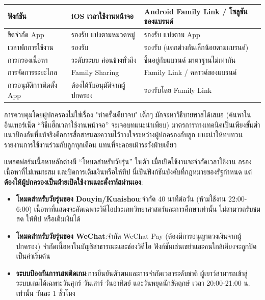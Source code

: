 \begin{center}
\begin{tabularx}{\linewidth}{|X|X|X|}
\hline
\textbf{ฟังก์ชัน} & \textbf{iOS เวลาใช้งานหน้าจอ} & \textbf{Android Family Link / โซลูชันของแบรนด์} \tabularnewline
\hline
ขีดจำกัด App & รองรับ แบ่งตามหมวดหมู่ & รองรับ แบ่งตาม App \tabularnewline
เวลาพักการใช้งาน & รองรับ & รองรับ (แตกต่างกันเล็กน้อยตามแบรนด์) \tabularnewline
การกรองเนื้อหา & ระดับระบบ ค่อนข้างทั่วถึง & ขึ้นอยู่กับแบรนด์ มาตรฐานไม่เท่ากัน \tabularnewline
การจัดการระยะไกล & Family Sharing & Family Link / คลาวด์ของแบรนด์ \tabularnewline
การอนุมัติการติดตั้ง App & ต้องได้รับอนุมัติจากผู้ปกครอง & รองรับโดย Family Link \tabularnewline
\hline
\end{tabularx}
\end{center}

\begin{tcbwarn}{การควบคุมโดยผู้ปกครองไม่ใช่เรื่อง "ทำครั้งเดียวจบ"}
เด็กๆ มักจะหาวิธีบายพาสได้เสมอ (ค้นหาในอินเทอร์เน็ต “วิธีแฮ็กเวลาใช้งานหน้าจอ” จะเจอบทแนะนำเพียบ) มาตรการทางเทคนิคเป็นเพียงขั้นต่ำ แนวป้องกันที่แท้จริงคือการสื่อสารและความไว้วางใจระหว่างผู้ปกครองกับลูก แนะนำให้ทบทวนรายงานการใช้งานร่วมกับลูกทุกเดือน แทนที่จะคอยเฝ้าระวังฝ่ายเดียว

\end{tcbwarn}


แพลตฟอร์มเนื้อหาหลักต่างมี “โหมดสำหรับวัยรุ่น” ในตัว เมื่อเปิดใช้งานจะจำกัดเวลาใช้งาน กรองเนื้อหาที่ไม่เหมาะสม และปิดการเติมเงินหรือให้ทิป นี่เป็นฟังก์ชันบังคับที่กฎหมายของรัฐกำหนด แต่\textbf{ต้องให้ผู้ปกครองเป็นฝ่ายเปิดใช้งานและตั้งรหัสผ่านเอง}:

\begin{itemize}
  \item \textbf{โหมดสำหรับวัยรุ่นของ Douyin/Kuaishou}:จำกัด 40 นาทีต่อวัน (ห้ามใช้งาน 22:00-6:00) เนื้อหาที่แสดงจะคัดเฉพาะวิดีโอประเภทวิทยาศาสตร์และการศึกษาเท่านั้น ไม่สามารถรับชมสด ให้ทิป หรือเติมเงินได้
  \item \textbf{โหมดสำหรับวัยรุ่นของ WeChat}:จำกัด WeChat Pay (ต้องมีการอนุญาตวงเงินจากผู้ปกครอง) จำกัดเนื้อหาในบัญชีสาธารณะและช่องวิดีโอ ฟังก์ชันเช่นเขย่าและคนใกล้เคียงจะถูกปิดเป็นค่าเริ่มต้น
  \item \textbf{ระบบป้องกันการเสพติดเกม}:การยืนยันตัวตนและการจำกัดเวลาระดับชาติ ผู้เยาว์สามารถเข้าสู่ระบบเกมได้เฉพาะวันศุกร์ วันเสาร์ วันอาทิตย์ และวันหยุดนักขัตฤกษ์ เวลา 20:00-21:00 น. เท่านั้น วันละ 1 ชั่วโมง
\end{itemize}


